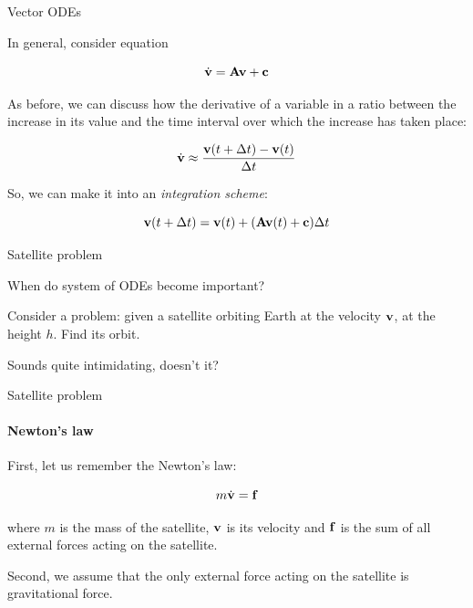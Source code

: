 \documentclass{beamer}
\begin{document}
\begin{frame}{Vector ODEs}
	\begin{flushleft}
		
		In general, consider equation
		
		\begin{equation}
			\dot{\mathbf{v}} = 
			\mathbf{A}\mathbf{v}
			+
			\mathbf{c}
		\end{equation}		
		
		As before, we can discuss how the derivative of a variable in a ratio between the increase in its value and the time interval over which the increase has taken place:
		
		\begin{equation}
	\dot{\mathbf{v}} \approx
	\frac{\mathbf{v}(t + \Delta t) - \mathbf{v}(t)}{\Delta t}
		\end{equation}				
		
		So, we can make it into an \emph{integration scheme}:
		
		\begin{equation}
			\mathbf{v}(t + \Delta t) = \mathbf{v}(t) + (\mathbf{A}\mathbf{v}(t) + \mathbf{c}) \Delta t
		\end{equation}			
		
	\end{flushleft}
\end{frame}



\begin{frame}{Satellite problem}
	\begin{flushleft}
		
		When do system of ODEs become important?
		
		\bigskip
		
		Consider a problem: given a satellite orbiting Earth at the velocity $\mathbf{v}$, at the height $h$. Find its orbit.
		
		\bigskip
		
		Sounds quite intimidating, doesn't it?
		
	\end{flushleft}
\end{frame}




\begin{frame}{Satellite problem}
\framesubtitle{Newton's law}
	\begin{flushleft}
		
		First, let us remember the Newton's law:
		
		\begin{equation}
			m \dot{\mathbf{v}} = \mathbf{f}
		\end{equation}
		
		where $m$ is the mass of the satellite, $\mathbf{v}$ is its velocity and $\mathbf{f}$ is the sum of all external forces acting on the satellite.
		
		\bigskip
		
		Second, we assume that the only external force acting on the satellite is gravitational force.
		
	\end{flushleft}
\end{frame}
\end{document}
